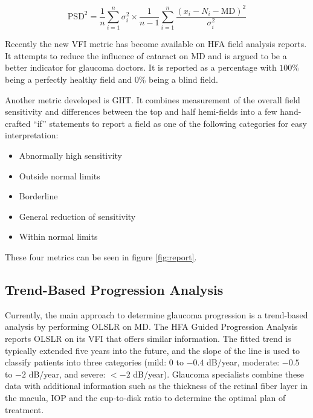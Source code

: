 \begin{equation} \label{eq:psd}
\textrm{PSD}^2 =
	\frac{1}{n}
	\sum\limits_{i=1}^{n} 
	\sigma_{i}^2
	\times
	\frac{1}{n-1}
	\sum\limits_{i=1}^{n} 
	\frac{(x_i-N_i-\textrm{MD})^2}{\sigma_{i}^2} 
\end{equation}

Recently the new \ac{VFI} metric has become available on \ac{HFA} field analysis reports. It attempts to reduce the influence of cataract on \ac{MD} and is argued to be a better indicator for glaucoma doctors. It is reported as a percentage with $100\%$ being a perfectly healthy field and $0\%$ being a blind field. \cite{Bengtsson2008}

Another metric developed is \ac{GHT}. It combines measurement of the overall field sensitivity and differences between the top and half hemi-fields into a few hand-crafted ``if'' statements to report a field as one of the following categories for easy interpretation: \cite{Asman1992}

\begin{itemize}
	\item Abnormally high sensitivity
	\item Outside normal limits
	\item Borderline
	\item General reduction of sensitivity
	\item Within normal limits
\end{itemize}

These four metrics can be seen in figure \ref{fig:report}.

\subsection{Trend-Based Progression Analysis}

Currently, the main approach to determine glaucoma progression is a trend-based analysis by performing \ac{OLSLR} on MD. The \ac{HFA} Guided Progression Analysis reports \ac{OLSLR} on its \ac{VFI} that offers similar information. The fitted trend is typically extended five years into the future, and the slope of the line is used to classify patients into three categories (mild: $0$ to $-0.4$ dB/year, moderate: $-0.5$ to $-2$ dB/year, and severe: $<-2$ dB/year). \cite{Chauhan2008} Glaucoma specialists combine these data with additional information such as the thickness of the retinal fiber layer in the macula, \ac{IOP} and the cup-to-disk ratio to determine the optimal plan of treatment. 

